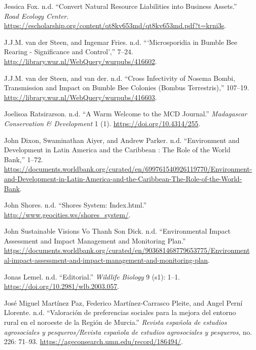 \begin{CSLReferences}{1}{0}
Jessica Fox. n.d. {``Convert Natural Resource Liabilities into Business
Assets.''} \emph{Road Ecology Center}.
\url{https://escholarship.org/content/qt8kv653md/qt8kv653md.pdf?t=krni3s}.

J.J.M. van der Steen, and Ingemar Fries. n.d. {``{`Microsporidia in
Bumble Bee Rearing - Significance and Control'},''} 7--24.
\url{http://library.wur.nl/WebQuery/wurpubs/416602}.

J.J.M. van der Steen, and van der. n.d. {``Cross Infectivity of Nosema
Bombi, Transmission and Impact on Bumble Bee Colonies (Bombus
Terrestris),''} 107--19.
\url{http://library.wur.nl/WebQuery/wurpubs/416603}.

Joelisoa Ratsirarson. n.d. {``A Warm Welcome to the MCD Journal.''}
\emph{Madagascar Conservation \& Development} 1 (1).
\url{https://doi.org/10.4314/255}.

John Dixon, Swaminathan Aiyer, and Andrew Parker. n.d. {``Environment
and Development in Latin America and the Caribbean : The Role of the
World Bank,''} 1--72.
\url{https://documents.worldbank.org/curated/en/699761540926119770/Environment-and-Development-in-Latin-America-and-the-Caribbean-The-Role-of-the-World-Bank}.

John Shores. n.d. {``Shores System: Index.html.''}
\url{http://www.geocities.ws/shores_system/}.

John Sustainable Visions Vo Thanh Son Dick. n.d. {``Environmental Impact
Assessment and Impact Management and Monitoring Plan.''}
\url{https://documents.worldbank.org/curated/en/903681468779653775/Environmental-impact-assessment-and-impact-management-and-monitoring-plan}.

Jonas Lemel. n.d. {``Editorial.''} \emph{Wildlife Biology} 9 (s1): 1--1.
\url{https://doi.org/10.2981/wlb.2003.057}.

José Miguel Martínez Paz, Federico Martínez‐Carrasco Pleite, and Angel
Perní Llorente. n.d. {``Valoración de preferencias sociales para la
mejora del entorno rural en el noroeste de la Región de Murcia.''}
\emph{Revista española de estudios agrosociales y pesqueros/Revista
española de estudios agrosociales y pesqueros}, no. 226: 71--93.
\url{https://ageconsearch.umn.edu/record/186494/}.


\end{CSLReferences}
